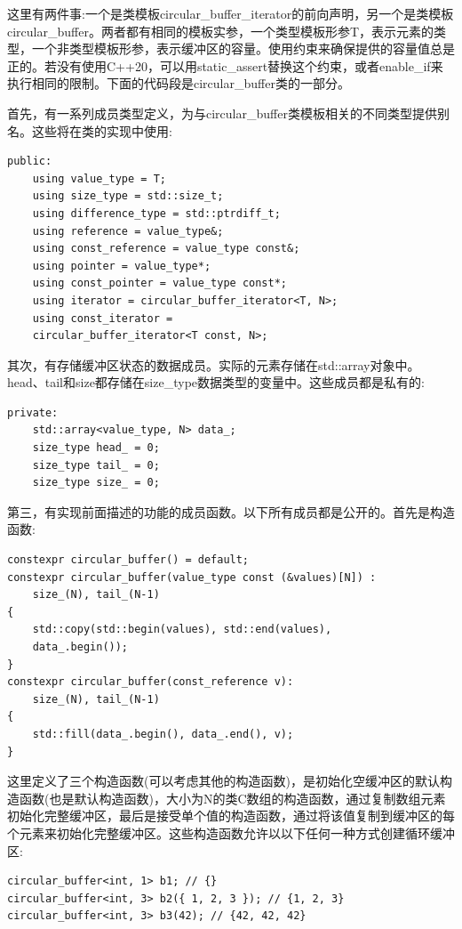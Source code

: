 这里有两件事:一个是类模板circular\_buffer\_iterator的前向声明，另一个是类模板circular\_buffer。两者都有相同的模板实参，一个类型模板形参T，表示元素的类型，一个非类型模板形参，表示缓冲区的容量。使用约束来确保提供的容量值总是正的。若没有使用C++20，可以用static\_assert替换这个约束，或者enable\_if来执行相同的限制。下面的代码段是circular\_buffer类的一部分。

首先，有一系列成员类型定义，为与circular\_buffer类模板相关的不同类型提供别名。这些将在类的实现中使用:

\begin{lstlisting}[style=styleCXX]
	public:
	using value_type = T;
	using size_type = std::size_t;
	using difference_type = std::ptrdiff_t;
	using reference = value_type&;
	using const_reference = value_type const&;
	using pointer = value_type*;
	using const_pointer = value_type const*;
	using iterator = circular_buffer_iterator<T, N>;
	using const_iterator =
	circular_buffer_iterator<T const, N>;
\end{lstlisting}

其次，有存储缓冲区状态的数据成员。实际的元素存储在std::array对象中。head、tail和size都存储在size\_type数据类型的变量中。这些成员都是私有的:

\begin{lstlisting}[style=styleCXX]
private:
	std::array<value_type, N> data_;
	size_type head_ = 0;
	size_type tail_ = 0;
	size_type size_ = 0;
\end{lstlisting}

第三，有实现前面描述的功能的成员函数。以下所有成员都是公开的。首先是构造函数:

\begin{lstlisting}[style=styleCXX]
constexpr circular_buffer() = default;
constexpr circular_buffer(value_type const (&values)[N]) :
	size_(N), tail_(N-1)
{
	std::copy(std::begin(values), std::end(values),
	data_.begin());
}
constexpr circular_buffer(const_reference v):
	size_(N), tail_(N-1)
{
	std::fill(data_.begin(), data_.end(), v);
}
\end{lstlisting}

这里定义了三个构造函数(可以考虑其他的构造函数)，是初始化空缓冲区的默认构造函数(也是默认构造函数)，大小为N的类C数组的构造函数，通过复制数组元素初始化完整缓冲区，最后是接受单个值的构造函数，通过将该值复制到缓冲区的每个元素来初始化完整缓冲区。这些构造函数允许以以下任何一种方式创建循环缓冲区:

\begin{lstlisting}[style=styleCXX]
circular_buffer<int, 1> b1; // {}
circular_buffer<int, 3> b2({ 1, 2, 3 }); // {1, 2, 3}
circular_buffer<int, 3> b3(42); // {42, 42, 42}
\end{lstlisting}


